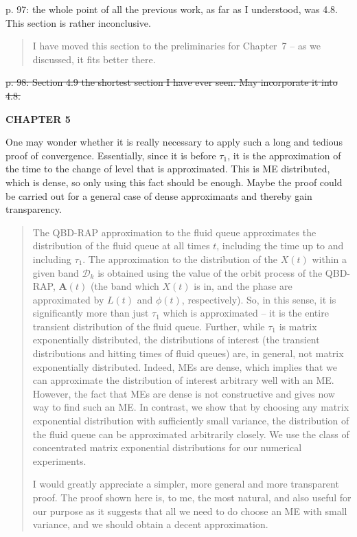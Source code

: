 \documentclass[a4paper]{article}
\begin{document}
p. 97: the whole point of all the previous work, as far as I understood, was 4.8. This section is rather inconclusive.
\begin{quote}
    I have moved this section to the preliminaries for Chapter~7 -- as we discussed, it fits better there.
\end{quote}

\st{p. 98: Section 4.9 the shortest section I have ever seen. May incorporate it into 4.8.} 

\noindent\textbf{CHAPTER 5}

One may wonder whether it is really necessary to apply such a long and tedious proof of convergence. Essentially, since it is before \(\tau_1\), it is the approximation of the time to the change of level that is approximated. This is ME distributed, which is dense, so only using this fact should be enough. Maybe the proof could be carried out for a general case of dense approximants and thereby gain transparency.
\begin{quote}
    The QBD-RAP approximation to the fluid queue approximates the distribution of the fluid queue at all times \(t\), including the time up to and including \(\tau_1\). The approximation to the distribution of the \(X(t)\) within a given band \(\mathcal D_k\) is obtained using the value of the orbit process of the QBD-RAP, \(\boldsymbol A(t)\) (the band which \(X(t)\) is in, and the phase are approximated by \(L(t)\) and \(\phi(t)\), respectively). So, in this sense, it is significantly more than just \(\tau_1\) which is approximated -- it is the entire transient distribution of the fluid queue. Further, while \(\tau_1\) is matrix exponentially distributed, the distributions of interest (the transient distributions and hitting times of fluid queues) are, in general, not matrix exponentially distributed. Indeed, MEs are dense, which implies that we can approximate the distribution of interest arbitrary well with an ME. However, the fact that MEs are dense is not constructive and gives now way to find such an ME. In contrast, we show that by choosing any matrix exponential distribution with sufficiently small variance, the distribution of the fluid queue can be approximated arbitrarily closely. We use the class of concentrated matrix exponential distributions for our numerical experiments. 

    I would greatly appreciate a simpler, more general and more transparent proof. The proof shown here is, to me, the most natural, and also useful for our purpose as it suggests that all we need to do choose an ME with small variance, and we should obtain a decent approximation. 
\end{quote}
\end{document}
